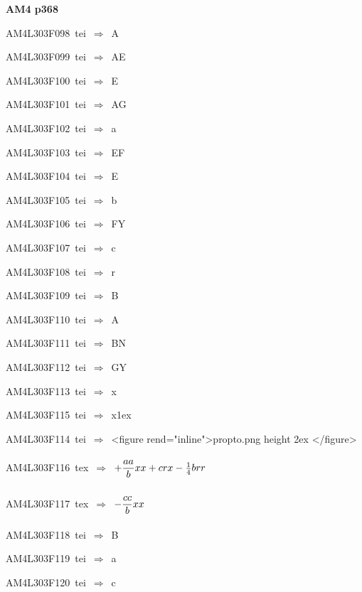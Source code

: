 \par\vfill\eject
{\bf\hfill AM4 p368\hfill\hbox{}}\par\bigskip
{\sixrm AM4L303F098\ {\sixit tei}\ }$\Rightarrow$\ A\par\smallskip
{\sixrm AM4L303F099\ {\sixit tei}\ }$\Rightarrow$\ AE\par\smallskip
{\sixrm AM4L303F100\ {\sixit tei}\ }$\Rightarrow$\ E\par\smallskip
{\sixrm AM4L303F101\ {\sixit tei}\ }$\Rightarrow$\ AG\par\smallskip
{\sixrm AM4L303F102\ {\sixit tei}\ }$\Rightarrow$\ {\tenit a}\par\smallskip
{\sixrm AM4L303F103\ {\sixit tei}\ }$\Rightarrow$\ EF\par\smallskip
{\sixrm AM4L303F104\ {\sixit tei}\ }$\Rightarrow$\ E\par\smallskip
{\sixrm AM4L303F105\ {\sixit tei}\ }$\Rightarrow$\ {\tenit b}\par\smallskip
{\sixrm AM4L303F106\ {\sixit tei}\ }$\Rightarrow$\ FY\par\smallskip
{\sixrm AM4L303F107\ {\sixit tei}\ }$\Rightarrow$\ {\tenit c}\par\smallskip
{\sixrm AM4L303F108\ {\sixit tei}\ }$\Rightarrow$\ {\tenit r}\par\smallskip
{\sixrm AM4L303F109\ {\sixit tei}\ }$\Rightarrow$\ B\par\smallskip
{\sixrm AM4L303F110\ {\sixit tei}\ }$\Rightarrow$\ A\par\smallskip
{\sixrm AM4L303F111\ {\sixit tei}\ }$\Rightarrow$\ BN\par\smallskip
{\sixrm AM4L303F112\ {\sixit tei}\ }$\Rightarrow$\ GY\par\smallskip
{\sixrm AM4L303F113\ {\sixit tei}\ }$\Rightarrow$\ {\tenit x}\par\smallskip
{\sixrm AM4L303F115\ {\sixit tei}\ }$\Rightarrow$\ {\tenit x}\raise1ex\hbox{}\par\smallskip
{\sixrm AM4L303F114\ {\sixit tei}\ }$\Rightarrow$\ <figure rend="inline">\XeTeXpicfile propto.png height 2ex </figure>\par\smallskip
{\sixrm AM4L303F116\ {\sixit tex}\ }$\Rightarrow$\ $+ {{\displaystyle\strut aa\over \displaystyle\strut b}}xx + crx - {{1\over 4}}brr$\par\smallskip
{\sixrm AM4L303F117\ {\sixit tex}\ }$\Rightarrow$\ $- {{\displaystyle\strut cc\over \displaystyle\strut b}}xx$\par\smallskip
{\sixrm AM4L303F118\ {\sixit tei}\ }$\Rightarrow$\ B\par\smallskip
{\sixrm AM4L303F119\ {\sixit tei}\ }$\Rightarrow$\ {\tenit a}\par\smallskip
{\sixrm AM4L303F120\ {\sixit tei}\ }$\Rightarrow$\ {\tenit c}\par\smallskip

